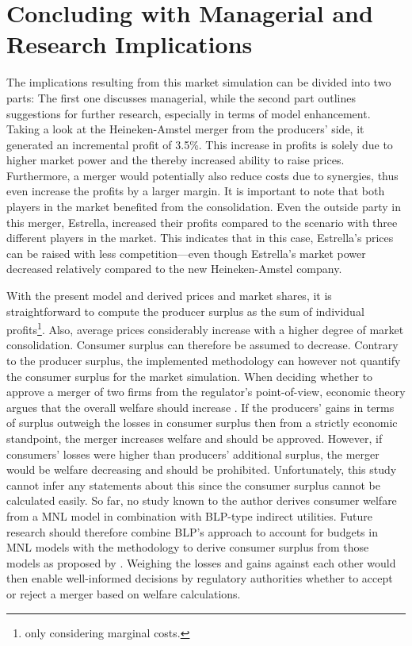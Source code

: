 \documentclass[12pt,a4paper]{article}
\begin{document}
\section{Concluding with Managerial and Research Implications}
The implications resulting from this market simulation can be divided into two parts: The first one discusses managerial,
while the second part outlines suggestions for further research, especially in terms of model enhancement. 
Taking a look at the Heineken-Amstel merger from the producers' side, it generated an incremental profit of 3.5\%.
This increase in profits is solely due to higher market power and the thereby increased ability to raise prices.
Furthermore, a merger would potentially also reduce costs due to synergies, thus even increase the profits by a larger margin.
It is important to note that both players in the market benefited from the consolidation.
Even the outside party in this merger, Estrella, increased their profits compared to the scenario with three different players in the market.
This indicates that in this case, Estrella's prices can be raised with less competition---even though Estrella's market power decreased relatively compared to the new Heineken-Amstel company.

With the present model and derived prices and market shares, it is straightforward to compute the producer surplus as the sum of individual profits\footnote{only considering marginal costs.}.
Also, average prices considerably increase with a higher degree of market consolidation.
Consumer surplus can therefore be assumed to decrease.
Contrary to the producer surplus, the implemented methodology can however not quantify the consumer surplus for the market simulation.
When deciding whether to approve a merger of two firms from the regulator's point-of-view, economic theory argues that the overall welfare should increase \citep{perryOligopolyIncentiveHorizontal1985}.
If the producers' gains in terms of surplus outweigh the losses in consumer surplus then from a strictly economic standpoint, the merger increases welfare and should be approved.
However, if consumers' losses were higher than producers' additional surplus, the merger would be welfare decreasing and should be prohibited.
Unfortunately, this study cannot infer any statements about this since the consumer surplus cannot be calculated easily.
So far, no study known to the author derives consumer welfare from a MNL model in combination with BLP-type indirect utilities.
Future research should therefore combine BLP's approach to account for budgets in MNL models with the methodology to derive consumer surplus from those models as proposed by \cite{trainWelfareCalculationsDiscrete2015}.
Weighing the losses and gains against each other would then enable well-informed decisions by regulatory authorities whether to accept or reject a merger based on welfare calculations.
\end{document}
